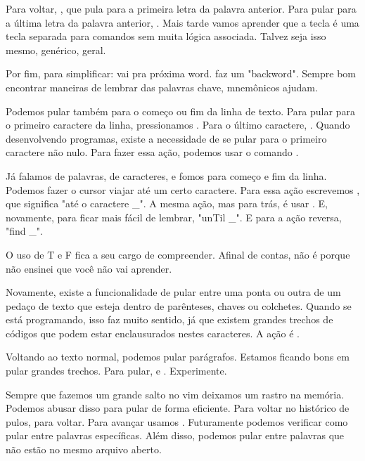 Para voltar, , que pula para a primeira letra da palavra anterior.
Para pular para a última letra da palavra anterior, .
Mais tarde vamos aprender que a tecla  é uma tecla separada para comandos sem muita lógica associada.
Talvez seja isso mesmo, genérico, geral.

Por fim, para simplificar:  vai pra próxima word.  faz um "backword".
Sempre bom encontrar maneiras de lembrar das palavras chave, mnemônicos ajudam.


Podemos pular também para o começo ou fim da linha de texto.
Para pular para o primeiro caractere da linha, pressionamos .
Para o último caractere, \vimcommand{\$}.
Quando desenvolvendo programas, existe a necessidade de se pular para o primeiro caractere não nulo.
Para fazer essa ação, podemos usar o comando \vimcommand{\^}.

Já falamos de palavras, de caracteres, e fomos para começo e fim da linha.
Podemos fazer o cursor viajar até um certo caractere.
Para essa ação escrevemos , que significa "até o caractere \_".
A mesma ação, mas para trás, é usar .
E, novamente, para ficar mais fácil de lembrar, "unTil \_".
E para a ação reversa, "find \_".

O uso de T e F fica a seu cargo de compreender.
Afinal de contas, não é porque não ensinei que você não vai aprender.


Novamente, existe a funcionalidade de pular entre uma ponta ou outra de um pedaço de
texto que esteja dentro de parênteses, chaves ou colchetes.
Quando se está programando, isso faz muito sentido, já que existem grandes trechos de
códigos que podem estar enclausurados nestes caracteres.
A ação é \vimcommand{\%}.


Voltando ao texto normal, podemos pular parágrafos.
Estamos ficando bons em pular grandes trechos.
Para pular, \vimcommand{\{} e \vimcommand{\}}. Experimente.


Sempre que fazemos um grande salto no vim deixamos um rastro na memória.
Podemos abusar disso para pular de forma eficiente.
Para voltar no histórico de pulos,  para voltar.
Para avançar usamos .
Futuramente podemos verificar como pular entre palavras específicas.
Além disso, podemos pular entre palavras que não estão no mesmo arquivo aberto.

